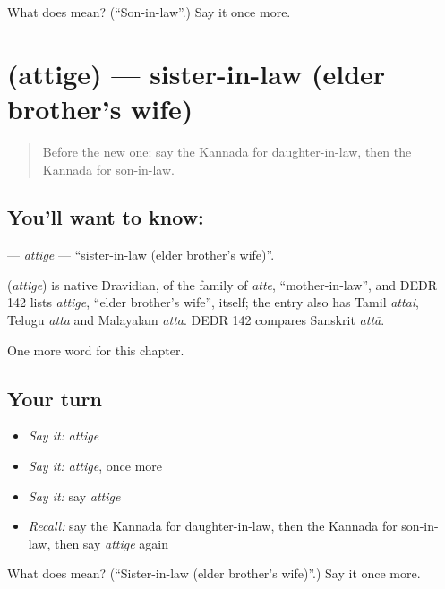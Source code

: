 \begin{tcolorbox}[breakable,colback=teal!4,colframe=teal!35!black,title={Before you move on}]
What does  mean? (\textquotedblleft{}Son-in-law\textquotedblright{}.) Say it once more.
\end{tcolorbox}
\section[\texorpdfstring{\kn{ಅತ್ತಿಗೆ} (attige)}{ಅತ್ತಿಗೆ (attige)}]{ (attige) — sister-in-law (elder brother's wife)}

\label{lesson:KA-C226-attige}



\begin{quote}
Before the new one: say the Kannada for daughter-in-law, then the Kannada for son-in-law.
\end{quote}

\subsection*{You'll want to know: }
\textbf{} — \emph{attige} — \textquotedblleft{}sister-in-law (elder brother's wife)\textquotedblright{}.

\begin{cousinweb}
\textbf{} (\emph{attige}) is native Dravidian, of the family of \emph{atte}, \textquotedblleft{}mother-in-law\textquotedblright{}, and DEDR 142 lists \emph{attige}, \textquotedblleft{}elder brother's wife\textquotedblright{}, itself; the entry also has Tamil \emph{attai}, Telugu \emph{atta} and Malayalam \emph{atta}. DEDR 142 compares Sanskrit \emph{attā}.
\end{cousinweb}

\begin{grammarlens}[title={What you've built}]
One more word for this chapter.
\end{grammarlens}

\subsection*{Your turn}
\begin{itemize}
\raggedright
  \item \emph{Say it:} \emph{attige}
  \item \emph{Say it:} \emph{attige}, once more
  \item \emph{Say it:} say \emph{attige}
  \item \emph{Recall:} say the Kannada for daughter-in-law, then the Kannada for son-in-law, then say \emph{attige} again
\end{itemize}

\begin{tcolorbox}[breakable,colback=teal!4,colframe=teal!35!black,title={Before you move on}]
What does  mean? (\textquotedblleft{}Sister-in-law (elder brother's wife)\textquotedblright{}.) Say it once more.
\end{tcolorbox}
